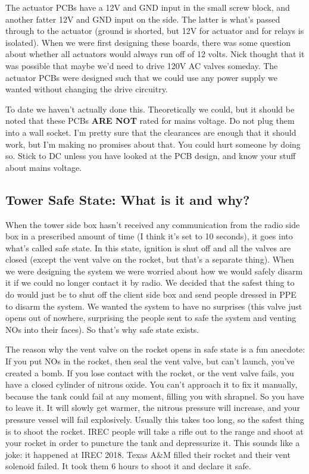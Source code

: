 \documentclass[11pt]{article}
\begin{document}
The actuator PCBs have a 12V and GND input in the small screw block, and
another fatter 12V and GND input on the side. The latter is what's passed
through to the actuator (ground is shorted, but 12V for actuator and for
relays is isolated). When we were first designing these boards, there was
some question about whether all actuators would always run off of 12
volts. Nick thought that it was possible that maybe we'd need to drive 120V
AC valves someday. The actuator PCBs were designed such that we could use
any power supply we wanted without changing the drive circuitry.

To date we haven't actually done this. Theoretically we could, but it
should be noted that these PCBs \textbf{ARE NOT} rated for mains voltage. Do not
plug them into a wall socket. I'm pretty sure that the clearances are
enough that it should work, but I'm making no promises about that. You
could hurt someone by doing so. Stick to DC unless you have looked at the
PCB design, and know your stuff about mains voltage.

\subsection{Tower Safe State: What is it and why?}
\label{sec:orgaa5a088}

When the tower side box hasn't received any communication from the radio
side box in a prescribed amount of time (I think it's set to 10 seconds),
it goes into what's called safe state. In this state, ignition is shut off
and all the valves are closed (except the vent valve on the rocket, but
that's a separate thing). When we were designing the system we were worried
about how we would safely disarm it if we could no longer contact it by
radio. We decided that the safest thing to do would just be to shut off the
client side box and send people dressed in PPE to disarm the system. We
wanted the system to have no surprises (this valve just opens out of
nowhere, surprising the people sent to safe the system and venting NOs into
their faces). So that's why safe state exists.

The reason why the vent valve on the rocket opens in safe state is a fun
anecdote: If you put NOs in the rocket, then seal the vent valve, but can't
launch, you've created a bomb. If you lose contact with the rocket, or the
vent valve fails, you have a closed cylinder of nitrous oxide. You can't
approach it to fix it manually, because the tank could fail at any moment,
filling you with shrapnel. So you have to leave it. It will slowly get
warmer, the nitrous pressure will increase, and your pressure vessel will
fail explosively. Usually this takes too long, so the safest thing is to
shoot the rocket. IREC people will take a rifle out to the range and shoot
at your rocket in order to puncture the tank and depressurize it. This
sounds like a joke: it happened at IREC 2018. Texas A\&M filled their rocket
and their vent solenoid failed. It took them 6 hours to shoot it and
declare it safe.
\end{document}
